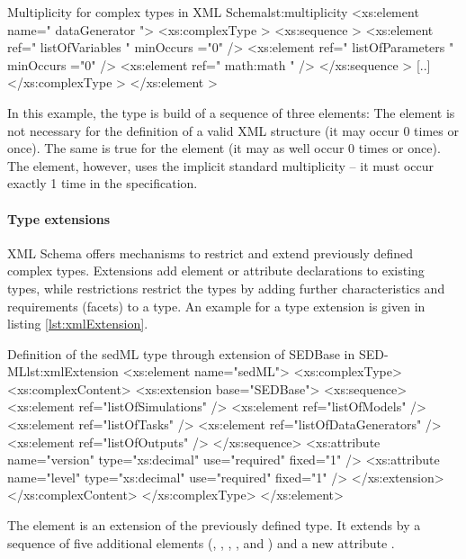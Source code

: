 \begin{myXmlLst}{Multiplicity for complex types in XML Schema}{lst:multiplicity}
<xs:element name=" dataGenerator ">
 <xs:complexType >
  <xs:sequence >
   <xs:element ref=" listOfVariables " minOccurs ="0" />
   <xs:element ref=" listOfParameters " minOccurs ="0" />
   <xs:element ref=" math:math " />
  </xs:sequence >
  [..]
 </xs:complexType >
</xs:element >
\end{myXmlLst}
%
In this example, the  type is build of a sequence of three elements: The  element is not necessary for the definition of a valid  XML structure (it may occur 0 times or once). The same is true for the  element (it may as well occur 0 times or once). The  element, however, uses the implicit standard multiplicity -- it must occur exactly 1 time in the  specification.

\paragraph{Type extensions}
XML Schema offers mechanisms to restrict and extend previously defined complex types. Extensions add element or attribute declarations to existing types, while restrictions restrict the types by adding further characteristics and requirements (facets) to a type. An example for a type extension is given in listing \ref{lst:xmlExtension}.
%
\begin{myXmlLst}{Definition of the sedML type through extension of SEDBase in SED-ML}{lst:xmlExtension}
<xs:element name="sedML">
 <xs:complexType>
  <xs:complexContent>
   <xs:extension base="SEDBase">
    <xs:sequence>
     <xs:element ref="listOfSimulations" />
     <xs:element ref="listOfModels" />
     <xs:element ref="listOfTasks" />
     <xs:element ref="listOfDataGenerators" />
     <xs:element ref="listOfOutputs" />
    </xs:sequence>
    <xs:attribute name="version" type="xs:decimal" use="required" fixed="1" />
    <xs:attribute name="level" type="xs:decimal" use="required" fixed="1" />
   </xs:extension>
  </xs:complexContent>
 </xs:complexType>
</xs:element>
\end{myXmlLst}
%
The  element is an extension of the previously defined  type. It extends  by a sequence of five additional elements (, , , , and ) and a new attribute .


